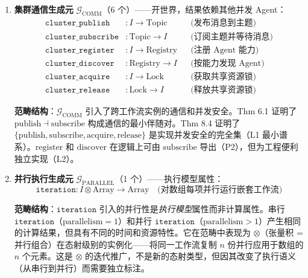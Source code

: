 \documentclass[11pt,a4paper]{article}
\theoremstyle{definition}
\theoremstyle{definition}
\theoremstyle{remark}
\newcommand{\tensor}{\otimes}
\begin{document}
\begin{enumerate}[leftmargin=2em,label=\textbf{类别 \arabic*:}]
\textbf{范畴结构}：$\mathcal{G}_{\mathrm{IO}}$ 引入的外部世界依赖不能用纯计算建模。每个 I/O 生成元的态射值不仅取决于其输入类型，还依赖于一个隐式的外部状态参数。它们在范畴中表现为\emph{新对象类型}（$\mathrm{Time}$, $\mathrm{Receipt}$, $\mathrm{Response}$）和\emph{新态射}（不能从 $\mathcal{G}_{\mathrm{CORE}}$ 生成）。$\mathtt{schedule\_trigger}$ 是 \texttt{start} 的 I/O 对应物——它将时间事件而非数据输入作为工作流的入口点。

\item \textbf{集群通信生成元} $\mathcal{G}_{\mathrm{COMM}}$（6 个）——开世界，结果依赖其他并发 Agent：
\[
\begin{aligned}
\mathtt{cluster\_publish}&: I \to \mathrm{Topic}       &&\text{(发布消息到主题)} \\
\mathtt{cluster\_subscribe}&: \mathrm{Topic} \to I     &&\text{(订阅主题并等待消息)} \\
\mathtt{cluster\_register}&: I \to \mathrm{Registry}   &&\text{(注册 Agent 能力)} \\
\mathtt{cluster\_discover}&: \mathrm{Registry} \to I   &&\text{(按能力发现 Agent)} \\
\mathtt{cluster\_acquire}&: I \to \mathrm{Lock}        &&\text{(获取共享资源锁)} \\
\mathtt{cluster\_release}&: \mathrm{Lock} \to I        &&\text{(释放共享资源锁)}
\end{aligned}
\]

\textbf{范畴结构}：$\mathcal{G}_{\mathrm{COMM}}$ 引入了跨工作流实例的通信和并发安全。Thm 6.1 证明了 $\mathrm{publish} \dashv \mathrm{subscribe}$ 构成通信的最小伴随对。Thm 8.4 证明了 $\{\mathrm{publish}, \mathrm{subscribe}, \mathrm{acquire}, \mathrm{release}\}$ 是实现并发安全的完全集（L1 最小谱系）。$\mathrm{register}$ 和 $\mathrm{discover}$ 在逻辑上可由 $\mathrm{subscribe}$ 导出（P2），但为工程便利独立实现（L2）。

\item \textbf{并行执行生成元} $\mathcal{G}_{\mathrm{PARALLEL}}$（1 个）——执行模型属性：
\[
\mathtt{iteration}: I \otimes \mathrm{Array} \to \mathrm{Array} \quad\text{(对数组每项并行运行嵌套工作流)}
\]

\textbf{范畴结构}：$\mathtt{iteration}$ 引入的并行性是\emph{执行模型}属性而非计算属性。串行 $\mathtt{iteration}$（$\mathrm{parallelism}=1$）和并行 $\mathtt{iteration}$（$\mathrm{parallelism}>1$）产生相同的计算结果，但具有不同的时间和资源特性。它在范畴中表现为 $\tensor$（张量积 = 并行组合）在态射级别的实例化——将同一工作流复制 $n$ 份并行应用于数组的 $n$ 个元素。这是 $\tensor$ 的迭代推广，不是新的态射类型，但因其改变了执行语义（从串行到并行）而需要独立标注。

\end{enumerate}
\end{document}
